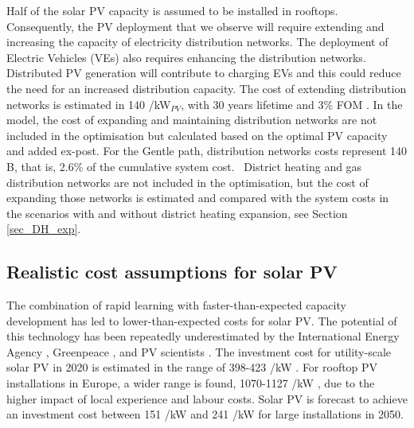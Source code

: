 \documentclass[3p]{elsarticle} %
\begin{document}
Half of the solar PV capacity is assumed to be installed in rooftops. Consequently, the PV deployment that we observe will require extending and increasing the capacity of electricity distribution networks. The deployment of Electric Vehicles (VEs) also requires enhancing the distribution networks. Distributed PV generation will contribute to charging EVs and this could reduce the need for an increased distribution capacity. The cost of extending distribution networks is estimated in 140 \EUR/kW$_{PV}$, with 30 years lifetime and 3\% FOM \cite{Sterchele_2020, DEA_2019}. In the model, the cost of expanding and maintaining distribution networks are not included in the optimisation but calculated based on the optimal PV capacity and added ex-post. For the Gentle path, distribution networks costs represent 140 B\EUR, that is, 2.6\% of the cumulative system cost.  \
District heating and gas distribution networks are not included in the optimisation, but the cost of expanding those networks is estimated and compared with the system costs in the scenarios with and without district heating expansion, see Section \ref{sec_DH_exp}. 

\subsection{Realistic cost assumptions for solar PV} 

The combination of rapid learning with faster-than-expected capacity development has led to lower-than-expected costs for solar PV. The potential of this technology has been repeatedly underestimated by the International Energy Agency \cite{Fell_2015}, Greenpeace \cite{Creutzig_2017}, and PV scientists \cite{Haegel_2019}. The investment cost for utility-scale solar PV in 2020 is estimated in the range of 398-423 \EUR/kW \cite{Vartiainen_2017, DEA_2019}. For rooftop PV installations in Europe, a wider range is found, 1070-1127 \EUR/kW \cite{DEA_2019, Fraunhofer, Vartiainen_2019}, due to the higher impact of local experience and labour costs. Solar PV is forecast to achieve an investment cost between 151 \EUR/kW \cite{Vartiainen_2019} and 241 \EUR/kW  \cite{DEA_2019} for large installations in 2050. \\
\end{document}
